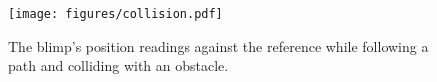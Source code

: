 \documentclass[conference]{ieeeconf}
\newcommand{\david}[1]{{\color{blue}#1}}
\begin{document}


\begin{figure}[t]
    \centering
    \texttt{[image: figures/collision.pdf]}
    \caption{The blimp's position readings against the reference while following a path and colliding with an obstacle. }
    \label{fig:obstacle} 
    \vspace{-1em}
\end{figure}
\end{document}
